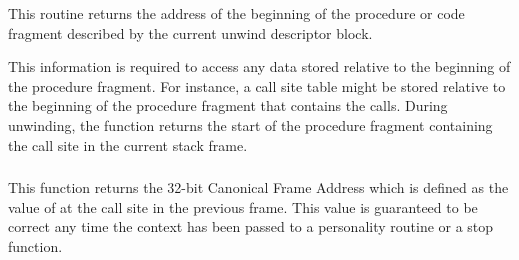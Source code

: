 This routine returns the address of the beginning of the procedure or
code fragment described by the current unwind descriptor block.

This information is required to access any data stored relative to the
beginning of the procedure fragment. For instance, a call site table
might be stored relative to the beginning of the procedure fragment
that contains the calls. During unwinding, the function returns the
start of the procedure fragment containing the call site in the current
stack frame.

\subsubsection{}


This function returns the 32-bit Canonical Frame Address which
is defined as the value of \ESP at the call site in the
previous frame.  This value is guaranteed to be correct any
time the context has been passed to a personality routine or a
stop function.

%
%
%
%
%
%
%
